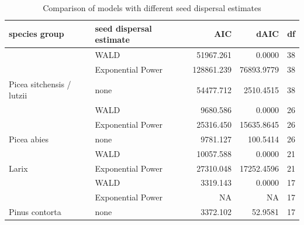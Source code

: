 \documentclass[
]{article}
\begin{document}
\begin{table}

\caption{\label{tab:model-comparison-table}Comparison of models with different seed dispersal estimates}
\centering
\begin{tabular}[t]{llrrr}
\toprule
species group & seed dispersal estimate & AIC & dAIC & df\\
\midrule
 & WALD & 51967.261 & 0.0000 & 38\\

 & Exponential Power & 128861.239 & 76893.9779 & 38\\

\multirow{-3}{*}{\raggedright\arraybackslash Picea sitchensis / lutzii} & none & 54477.712 & 2510.4515 & 38\\
\cmidrule{1-5}
 & WALD & 9680.586 & 0.0000 & 26\\

 & Exponential Power & 25316.450 & 15635.8645 & 26\\

\multirow{-3}{*}{\raggedright\arraybackslash Picea abies} & none & 9781.127 & 100.5414 & 26\\
\cmidrule{1-5}
 & WALD & 10057.588 & 0.0000 & 21\\

\multirow{-2}{*}{\raggedright\arraybackslash Larix} & Exponential Power & 27310.048 & 17252.4596 & 21\\
\cmidrule{1-5}
 & WALD & 3319.143 & 0.0000 & 17\\

 & Exponential Power & NA & NA & 17\\

\multirow{-3}{*}{\raggedright\arraybackslash Pinus contorta} & none & 3372.102 & 52.9581 & 17\\
\bottomrule
\end{tabular}
\end{table}
\end{document}
